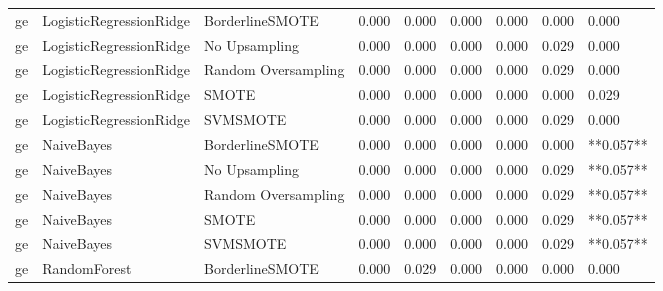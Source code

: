 \begin{tabular}{lllllllll}
      ge &      LogisticRegressionRidge &     BorderlineSMOTE & 0.000 &                     0.000 &                 0.000 &                  0.000 &                                   0.000 &     0.000 \\
      ge &      LogisticRegressionRidge &       No Upsampling & 0.000 &                     0.000 &                 0.000 &                  0.000 &                                   0.029 &     0.000 \\
      ge &      LogisticRegressionRidge & Random Oversampling & 0.000 &                     0.000 &                 0.000 &                  0.000 &                                   0.029 &     0.000 \\
      ge &      LogisticRegressionRidge &               SMOTE & 0.000 &                     0.000 &                 0.000 &                  0.000 &                                   0.000 &     0.029 \\
      ge &      LogisticRegressionRidge &            SVMSMOTE & 0.000 &                     0.000 &                 0.000 &                  0.000 &                                   0.029 &     0.000 \\
      ge &                   NaiveBayes &     BorderlineSMOTE & 0.000 &                     0.000 &                 0.000 &                  0.000 &                                   0.000 & **0.057** \\
      ge &                   NaiveBayes &       No Upsampling & 0.000 &                     0.000 &                 0.000 &                  0.000 &                                   0.029 & **0.057** \\
      ge &                   NaiveBayes & Random Oversampling & 0.000 &                     0.000 &                 0.000 &                  0.000 &                                   0.029 & **0.057** \\
      ge &                   NaiveBayes &               SMOTE & 0.000 &                     0.000 &                 0.000 &                  0.000 &                                   0.029 & **0.057** \\
      ge &                   NaiveBayes &            SVMSMOTE & 0.000 &                     0.000 &                 0.000 &                  0.000 &                                   0.029 & **0.057** \\
      ge &                 RandomForest &     BorderlineSMOTE & 0.000 &                     0.029 &                 0.000 &                  0.000 &                                   0.000 &     0.000 \\

\end{tabular}
